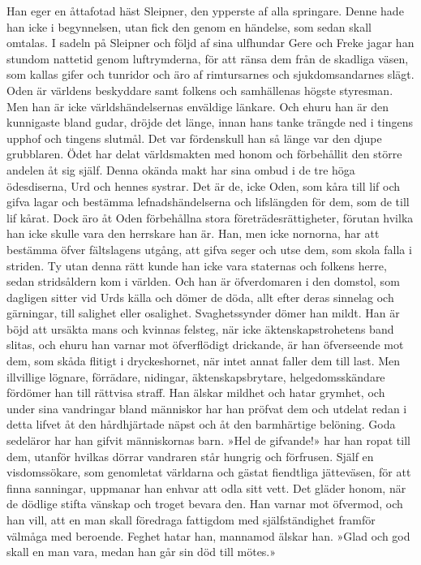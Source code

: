 Han eger en åttafotad häst Sleipner, den ypperste af alla springare.
Denne hade han icke i begynnelsen, utan fick den genom en händelse, som
sedan skall omtalas. I sadeln på Sleipner och följd af sina ulfhundar
Gere och Freke
jagar han stundom nattetid genom luftrymderna, för att ränsa dem från de
skadliga väsen, som kallas gifer och tunridor och äro af rimtursarnes
och sjukdomsandarnes slägt. Oden är världens beskyddare samt folkens och
samhällenas högste styresman. Men han är icke världshändelsernas
enväldige länkare. Och ehuru han är den kunnigaste bland gudar, dröjde
det länge, innan hans tanke trängde ned i tingens upphof och tingens
slutmål. Det var fördenskull han så länge var den djupe grubblaren. Ödet
har delat världsmakten med honom och förbehållit den större andelen åt
sig själf. Denna okända makt har sina ombud i de tre höga ödesdiserna,
Urd och hennes systrar. Det är de, icke Oden, som kåra till lif och
gifva lagar och bestämma lefnadshändelserna och lifslängden för dem, som
de till lif kårat. Dock äro åt Oden förbehållna stora
företrädesrättigheter, förutan hvilka han icke skulle vara den herrskare
han är. Han, men icke nornorna, har att bestämma öfver fältslagens
utgång, att gifva seger och utse dem, som skola falla i striden. Ty utan
denna rätt kunde han icke vara staternas och folkens herre, sedan
stridsåldern kom i världen. Och han är öfverdomaren i den domstol, som
dagligen sitter vid Urds källa och dömer de döda, allt efter deras
sinnelag och gärningar, till salighet eller osalighet. Svaghetssynder
dömer han mildt. Han är böjd att ursäkta mans och kvinnas felsteg, när
icke äktenskapstrohetens band slitas, och ehuru han varnar mot
öfverflödigt drickande, är han öfverseende mot dem, som skåda flitigt i
dryckeshornet, när intet annat faller dem till last. Men illvillige
lögnare, förrädare, nidingar, äktenskapsbrytare, helgedomsskändare
fördömer han till rättvisa straff. Han älskar mildhet och hatar grymhet,
och under sina vandringar bland människor har han pröfvat dem och
utdelat redan i detta lifvet åt den hårdhjärtade näpst och åt den
barmhärtige belöning. Goda sedeläror har han gifvit människornas barn.
»Hel de gifvande!» har han ropat till dem, utanför hvilkas dörrar
vandraren står hungrig och förfrusen. Själf en visdomssökare, som
genomletat världarna och gästat fiendtliga jätteväsen, för att finna
sanningar, uppmanar han enhvar att odla sitt vett. Det gläder honom, när
de dödlige stifta vänskap och troget bevara den. Han varnar mot
öfvermod, och han vill, att en man skall föredraga fattigdom med
själfständighet framför välmåga med beroende. Feghet hatar han, mannamod
älskar han. »Glad och god skall en man vara, medan han går sin död till
mötes.»

